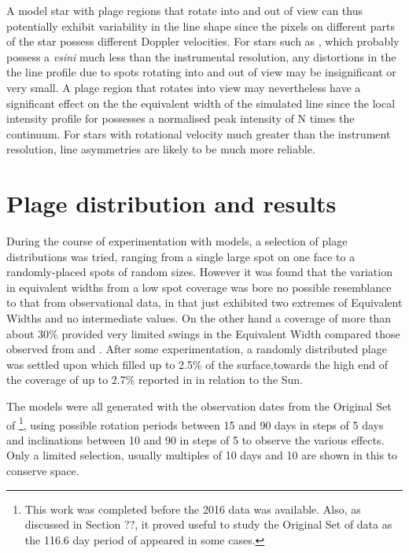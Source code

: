A model star with plage regions that rotate into and out of view can thus potentially exhibit variability in the line
shape since the pixels on different parts of the star possess different Doppler velocities. For stars such as \prox,
which probably possess a \textit{vsini} much less than the instrumental resolution, any distortions in the the line
profile due to spots rotating into and out of view may be insignificant or very small. A plage region that rotates into
view may nevertheless have a significant effect on the the equivalent width of the simulated line since the
local intensity profile for {\ha} possesses a normalised peak intensity of N times the continuum. For stars with
rotational velocity much greater than the instrument resolution, line asymmetries are likely to be much more reliable.

\section{Plage distribution and results}
During the course of experimentation with models, a selection of plage distributions was tried, ranging from a
single large spot on one face to a randomly-placed spots of random sizes. However it was found that the variation in
equivalent widths from a low spot coverage was bore no possible resemblance to that from observational data, in that just exhibited two extremes of Equivalent Widths
and no intermediate values. On the other hand a coverage of more than about 30\% provided very limited swings in the
Equivalent Width compared those observed from {\harps} and {\uves}. After some experimentation, a randomly distributed
plage was settled upon which filled up to 2.5\% of the surface,towards the high end of the coverage of up to 2.7\%
reported in \citet{guttenbrunner14} in relation to the Sun.

The models were all generated with the observation dates from the Original Set of {\harps}\footnote{This work was
  completed before the 2016 data was available. Also, as discussed in Section ??, it proved useful to study the Original
  Set of data as the 116.6 day period of \citet[Table 3]{suarezmascareno15} appeared in some cases.}, using possible rotation periods
between 15 and 90 days in steps of 5 days and inclinations between 10{\degree} and 90{\degree} in steps of 5{\degree} to
observe the various effects. Only a limited selection, usually multiples of 10 days and 10{\degree} are shown in this
{\paperorthesis} to conserve space.


